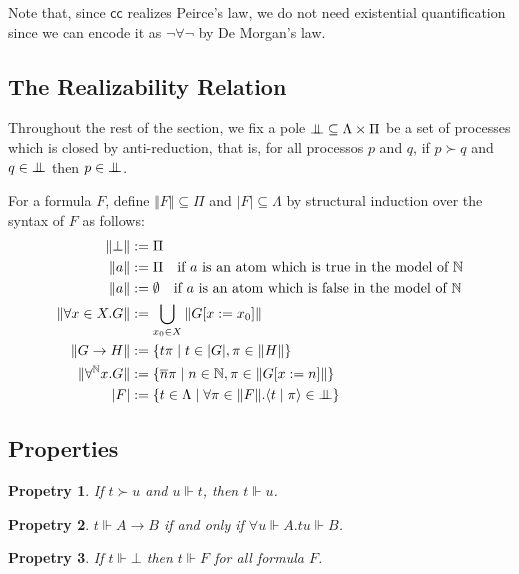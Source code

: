 \documentclass{article}
\newcommand{\N}{\mathbb{N}}
\newcommand{\proc}[2]{\langle{#1}\mid{#2}\rangle}
\newcommand{\depforall}[1]{\forall^\N #1.}
\newcommand{\pole}{\bot\mkern-10mu\bot}
\newcommand{\realizes}{\Vdash}
\newcommand{\cc}{\mathsf{cc}}
\newtheorem{property}{Propetry}
\begin{document}
Note that, since $\cc$ realizes Peirce's law, we do not need existential quantification since we can encode it as $\neg\forall\neg$ by De Morgan's law.

\subsection{The Realizability Relation}

Throughout the rest of the section, we fix a pole $\pole \subseteq \Lambda \times \Pi$ be a set of processes which is closed by anti-reduction, that is, for all processos $p$ and $q$, if $p \succ q$ and $q \in \pole$ then $p \in \pole$.

For a formula $F$, define $\Vert F \Vert \subseteq \Pi$ and $\vert F \vert \subseteq \Lambda$ by structural induction over the syntax of $F$ as follows:
\begin{align*}
    \Vert \bot \Vert & := \Pi \\
    \Vert a \Vert & := \Pi\ \ \ \text{if $a$ is an atom which is true in the model of $\N$} \\
    \Vert a \Vert & := \emptyset\ \ \ \text{if $a$ is an atom which is false in the model of $\N$} \\
    \Vert \forall x \in X. G \Vert & := \bigcup_{x_0 \in X} \Vert G[x := x_0] \Vert \\
    \Vert G \rightarrow H \Vert & := \{ t\pi \mid t \in \vert G \vert, \pi \in \Vert H \Vert \} \\
    \Vert \depforall{x} G \Vert & := \{ \overline{n}\pi \mid n \in \N, \pi \in \Vert G[x := n] \Vert \} \\
    \vert F \vert & := \{ t \in \Lambda \mid \forall \pi \in \Vert F \Vert. \proc{t}{\pi} \in \pole \}
\end{align*}

\subsection{Properties}

\begin{property}
    If $t \succ u$ and $u \realizes t$, then $t \realizes u$.
\end{property}

\begin{property}\label{impliesintro}
    $t \realizes A \rightarrow B$ if and only if $\forall u \realizes A. t u \realizes B$.
\end{property}

\begin{property}
    If $t \realizes \bot$ then $t \realizes F$ for all formula $F$.
\end{property}
\end{document}
